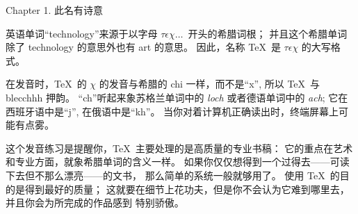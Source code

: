 


\beginchapter Chapter 1. 此名有诗意


\1 %
英语单词``technology''来源于以字母 $\tau\epsilon\chi\ldots\,$ 开头的希腊词根；%
并且这个希腊单词除了 technology 的意思外也有 art 的意思。%
因此，名称 \TeX\ 是 $\tau\epsilon\chi$ 的大写格式。

在发音时，\TeX\ 的 $\chi$ 的发音与希腊的 chi 一样，而不是``x'', %
所以 \TeX\ 与 blecchhh 押韵。%
``ch''听起来象苏格兰单词中的 {\sl loch\/} 或者德语单词中的 {\sl ach\/}; %
它在西班牙语中是``j'', 在俄语中是``kh''。%
当你对着计算机正确读出时，终端屏幕上可能有点雾。

这个发音练习是提醒你，\TeX\ 主要处理的是高质量的专业书稿：%
它的重点在艺术和专业方面，就象希腊单词的含义一样。%
如果你仅仅想得到一个过得去——可读下去但不那么漂亮——的文书，%
那么简单的系统一般就够用了。%
使用 \TeX\ 的目的是得到{最好的}质量；%
这就要在细节上花功夫，但是你不会认为它难到哪里去，并且你会为所完成的作品感到%
特别骄傲。

